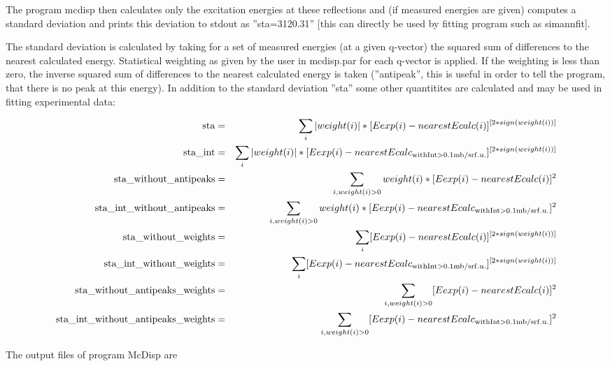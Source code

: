 The
program {\prg mcdisp} then calculates only 
the excitation energies at these reflections and (if measured
energies are given) computes a standard deviation
and prints
this deviation to stdout as ''sta=3120.31'' [this can directly
be used by fitting program such as {\prg simannfit}].

The standard deviation is calculated by taking for a set of measured energies (at a 
given q-vector) the squared sum of differences to the nearest
calculated energy. Statistical weighting as given by the user in {\prg mcdisp.par}
for each q-vector is applied. If the weighting is less than zero, the 
inverse squared sum of differences to the nearest
calculated energy is taken (''antipeak'', this is useful in order to 
tell the program, that there is no peak at this energy).
In addition to the standard deviation ''sta'' some other quantitites are calculated and 
may be used in fitting experimental data:

\begin{eqnarray}
{\rm sta}                              & =& \sum_i |weight(i)|*[Eexp(i) - nearestEcalc(i)]^{[2*sign(weight(i))]}\\
{\rm sta\_int   }                       & = &\sum_i |weight(i)|*[Eexp(i) - nearestEcalc_{\rm with %
Int>0.1mb/srf.u.}]^{[2*sign(weight(i))]}\\
{\rm sta\_without\_antipeaks }           & =& \sum_{i, weight(i)>0}  weight(i)*[Eexp(i) - nearestEcalc(i)]^2\\
{\rm sta\_int\_without\_antipeaks }       & =&\sum_{i,weight(i)>0}  weight(i)*[Eexp(i) - nearestEcalc_{\rm with %
Int>0.1mb/srf.u.}]^2\\
{\rm sta\_without\_weights }              &=& \sum_i [Eexp(i) - nearestEcalc(i)]^{[2*sign(weight(i))]}\\
{\rm sta\_int\_without\_weights}          & =&\sum_i [Eexp(i) - nearestEcalc_{\rm with %
Int>0.1mb/srf.u.}]^{[2*sign(weight(i))]}\\
{\rm sta\_without\_antipeaks\_weights}    & = &\sum_{i, weight(i)>0}[Eexp(i) - nearestEcalc(i)]^2\\
{\rm sta\_int\_without\_antipeaks\_weights}& =& \sum_{i, weight(i)>0} [Eexp(i) - nearestEcalc_{\rm with %
Int>0.1mb/srf.u.}]^2\\
\end{eqnarray}




The output files of program {\prg McDisp} are 

